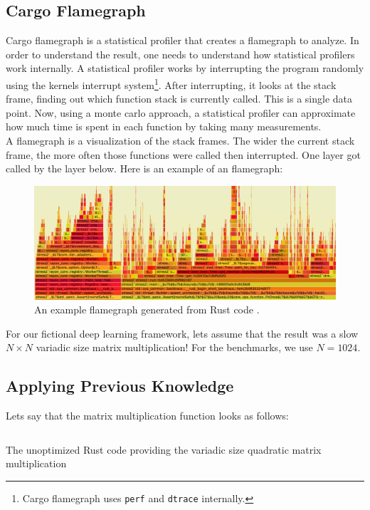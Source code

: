 \subsection{Cargo Flamegraph}

Cargo flamegraph \cite{flamegraph} is a statistical profiler that creates a flamegraph to analyze. In order to understand the result, one needs to understand how statistical profilers work internally.
A statistical profiler works by interrupting the program randomly using the kernels interrupt system\footnote{Cargo flamegraph uses \texttt{perf} and \texttt{dtrace} internally.}. After interrupting, it looks at the stack frame, finding out which function stack is currently called. This is a single data point. Now, using a monte carlo approach, a statistical profiler can approximate how much time is spent in each function by taking many measurements.\\

A flamegraph is a visualization of the stack frames. The wider the current stack frame, the more often those functions were called then interrupted. One layer got called by the layer below. Here is an example of an flamegraph:

\begin{figure}[H]
  \centering
  \includegraphics[width=\textwidth]{./assets/exampleflamegraph}
  \caption{An example flamegraph generated from Rust code \cite{flamegraph}.}
\end{figure}

For our fictional deep learning framework, lets assume that the result was a slow $N \times N$ variadic size matrix multiplication! For the benchmarks, we use $N=1024$.

\subsection{Applying Previous Knowledge}
Lets say that the matrix multiplication function looks as follows:

\begin{listing}[H]
  \inputminted{rust}{./assets/variadic_unoptimized.rs}
\caption{The unoptimized Rust code providing the variadic size quadratic matrix multiplication}
\end{listing}

